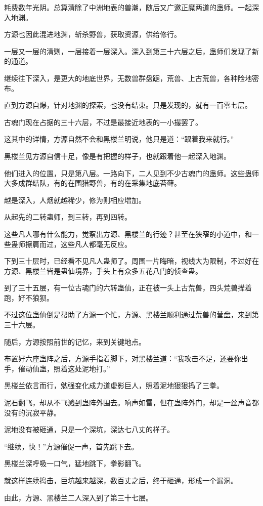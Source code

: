 \begin{this_body}
耗费数年光阴。总算清除了中洲地表的兽潮，随后又广邀正魔两道的蛊师。一起深入地渊。

方源也因此混进地渊，斩杀野兽，获取资源，供给修行。

一层又一层的清剿，一层接着一层深入。深入到第三十六层之后，蛊师们发现了新的通道。

继续往下深入，是更大的地底世界，无数兽群盘踞，荒兽、上古荒兽，各种险地密布。

直到方源自爆，针对地渊的探索，也没有结束。只是发现的，就有一百零七层。

古魂门现在占据的三十六层，不过是最接近地表的一小撮罢了。

这其中的详情，方源自然不会和黑楼兰明说，他只是道：“跟着我来就行。”

黑楼兰见方源自信十足，像是有把握的样子，也就跟着他一起深入地渊。

他们进入的位置，只是第八层。一路向下，二人见到不少古魂门的蛊师。这些蛊师大多成群结队，有的在围猎野兽，有的在采集地底苔藓。

越是深入，人烟就越稀少，修为则相应增加。

从起先的二转蛊师，到三转，再到四转。

这些凡人哪有什么能力，觉察出方源、黑楼兰的行迹？甚至在狭窄的小道中，和一些蛊师擦肩而过，这些凡人都毫无反应。

下到三十层时，已经看不见凡人蛊师了。周围一片晦暗，视线大为限制，不过好在方源、黑楼兰皆是蛊仙境界，手头上有众多五花八门的侦查蛊。

到了三十五层，有一位古魂门的六转蛊仙，正在被一头上古荒兽，四头荒兽撵着跑，好不狼狈。

不过这位蛊仙倒是帮助了方源一个忙，方源、黑楼兰顺利通过荒兽的营盘，来到第三十六层。

随后，方源按照前世的记忆，来到关键地点。

布置好六座蛊阵之后，方源手指着脚下，对黑楼兰道：“我攻击不足，还要你出手，催动仙蛊，照着这处泥地打。”

黑楼兰依言而行，勉强变化成力道虚影巨人，照着泥地狠狠捣了三拳。

泥石翻飞，却从不飞溅到蛊阵外围去。响声如雷，但在蛊阵外门，却是一丝声音都没有的沉寂平静。

泥地没有被砸通，只是一个深坑，深达七八丈的样子。

“继续，快！”方源催促一声，首先跳下去。

黑楼兰深呼吸一口气，猛地跳下，拳影翻飞。

就这样连续捣击，巨坑越来越深，数百丈之后，终于砸通，形成一个漏洞。

由此，方源、黑楼兰二人深入到了第三十七层。


\end{this_body}
